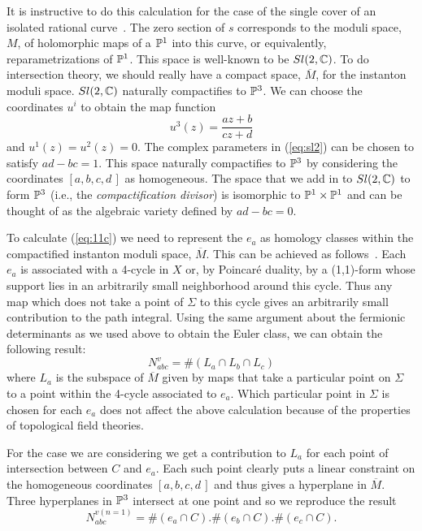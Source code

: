 It is instructive to do this calculation for the case of the single
cover of an isolated  rational curve~\cite{W:aspects}. The zero section of $s$
corresponds to the moduli space, $M$, of holomorphic maps of a $\Bbb{P}^{1}$ into
this curve, or equivalently, reparametrizations of $\Bbb{P}^{1}$. This space
is well-known to be $Sl(2,\Bbb{C})$. To do intersection theory, we
should really have a compact space, $\overline{M}$,
for the instanton moduli space. $Sl(2,\Bbb{C})$
naturally compactifies to $\Bbb{P}^{3}$. We can choose the coordinates $u^i$
to obtain the map
function
\begin{equation}
  u^3(z) = \frac{az+b}{cz+d}  \label{eq:sl2}
\end{equation}
and $u^1(z)=u^2(z)=0$. The complex parameters in (\ref{eq:sl2}) can be
chosen to satisfy $ad-bc=1$. This space naturally compactifies to $\Bbb{P}^{3}$
by considering the coordinates $[a,b,c,d\,]$ as homogeneous.
The space that we add in to $Sl(2,\Bbb{C})$ to form $\Bbb{P}^{3}$ (i.e., the
{\em compactification divisor\/}) is isomorphic to $\Bbb{P}^{1}\times\Bbb{P}^{1}$
and can be thought of as the algebraic variety defined by $ad-bc=0$.

To calculate (\ref{eq:11c}) we need to represent the $e_a$ as homology
classes within the compactified instanton moduli space,
$\overline{M}$. This can be achieved as follows~\cite{W:aspects}. Each $e_a$
is associated with a 4-cycle in $X$ or, by Poincar\'e duality, by a
(1,1)-form whose support lies in an arbitrarily small neighborhood
around this cycle. Thus any map which does not take a point of
$\Sigma$ to this cycle gives an arbitrarily small contribution to the
path integral. Using the same argument about the fermionic
determinants as we used above to obtain the Euler class, we can obtain
the following result:
\begin{equation}
  N^v_{abc}=\#(L_a\cap L_b\cap L_c)
\end{equation}
where $L_a$ is the subspace of $\overline{M}$ given by maps that take
a particular point on $\Sigma$ to a point within the 4-cycle
associated to $e_a$. Which particular point in $\Sigma$ is chosen for each
$e_a$ does not affect the above calculation because of the properties
of topological field theories.

For the case we are considering we get a contribution to $L_a$ for
each point of intersection between $C$ and $e_a$. Each such point
clearly puts a linear constraint on the homogeneous coordinates
$[a,b,c,d\,]$ and thus gives a hyperplane in $\overline{M}$. Three
hyperplanes in $\Bbb{P}^{3}$ intersect at one point and so we reproduce the
result
\begin{equation}
  N^{v(n=1)}_{abc}=\#(e_a\cap C).\#(e_b\cap C).\#(e_c\cap C).
	\label{eq:n-1}
\end{equation}

